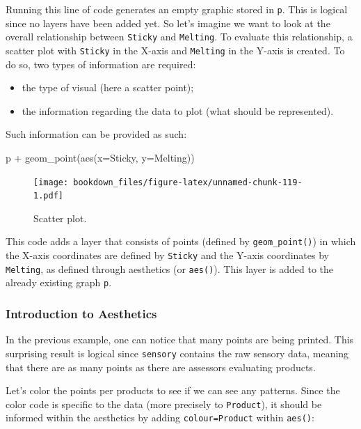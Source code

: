 \documentclass[
]{krantz}
\makeatletter
\newenvironment{Shaded}{\begin{snugshade}}{\end{snugshade}}
\newcommand{\AttributeTok}[1]{\textcolor[rgb]{0.61,0.61,0.61}{#1}}
\newcommand{\FunctionTok}[1]{\textcolor[rgb]{0,0,0}{#1}}
\newcommand{\NormalTok}[1]{#1}
\newcommand{\SpecialCharTok}[1]{\textcolor[rgb]{0,0,0}{#1}}
\providecommand{\tightlist}{%
  \setlength{\itemsep}{0pt}\setlength{\parskip}{0pt}}
\newenvironment{kframe}{%
\medskip{}
\setlength{\fboxsep}{.8em}
 \def\at@end@of@kframe{}%
 \ifinner\ifhmode%
  \def\at@end@of@kframe{\end{minipage}}%
  \begin{minipage}{\columnwidth}%
 \fi\fi%
 \def\FrameCommand##1{\hskip\@totalleftmargin \hskip-\fboxsep
 \colorbox{shadecolor}{##1}\hskip-\fboxsep
     \hskip-\linewidth \hskip-\@totalleftmargin \hskip\columnwidth}%
 \MakeFramed {\advance\hsize-\width
   \@totalleftmargin\z@ \linewidth\hsize
   \@setminipage}}%
 {\par\unskip\endMakeFramed%
 \at@end@of@kframe}
\renewenvironment{Shaded}{\begin{kframe}}{\end{kframe}}
\makeatother
\begin{document}
Running this line of code generates an empty graphic stored in \texttt{p}. This is logical since no layers have been added yet.
So let's imagine we want to look at the overall relationship between \texttt{Sticky} and \texttt{Melting}. To evaluate this relationship, a scatter plot with \texttt{Sticky} in the X-axis and \texttt{Melting} in the Y-axis is created. To do so, two types of information are required:

\begin{itemize}
\tightlist
\item
  the type of visual (here a scatter point);
\item
  the information regarding the data to plot (what should be represented).
\end{itemize}

Such information can be provided as such:

\begin{Shaded}
\begin{Highlighting}[]
\NormalTok{p }\SpecialCharTok{+} \FunctionTok{geom\_point}\NormalTok{(}\FunctionTok{aes}\NormalTok{(}\AttributeTok{x=}\NormalTok{Sticky, }\AttributeTok{y=}\NormalTok{Melting))}
\end{Highlighting}
\end{Shaded}

\begin{figure}
\centering
\texttt{[image: bookdown\_files/figure-latex/unnamed-chunk-119-1.pdf]}
\caption{\label{fig:unnamed-chunk-119}Scatter plot.}
\end{figure}

This code adds a layer that consists of points (defined by \texttt{geom\_point()}) in which the X-axis coordinates are defined by \texttt{Sticky} and the Y-axis coordinates by \texttt{Melting}, as defined through aesthetics (or \texttt{aes()}). This layer is added to the already existing graph \texttt{p}.

\hypertarget{scatter}{%
\subsubsection*{Introduction to Aesthetics}\label{scatter}}


In the previous example, one can notice that many points are being printed. This surprising result is logical since \texttt{sensory} contains the raw sensory data, meaning that there are as many points as there are assessors evaluating products.

Let's color the points per products to see if we can see any patterns. Since the color code is specific to the data (more precisely to \texttt{Product}), it should be informed within the aesthetics by adding \texttt{colour=Product} within \texttt{aes()}:
\end{document}
